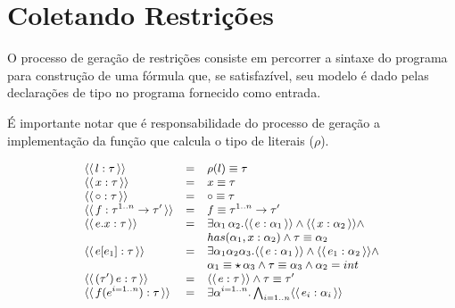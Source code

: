 \documentclass[a4paper,8pt]{article}
\newcommand{\constr}[1]{\ensuremath{\langle\langle\,#1\,\rangle\rangle}}
\begin{document}
      
     \section{Coletando Restrições}\label{constrcollect}

     O processo de geração de restrições consiste em percorrer a
     sintaxe do programa para construção de uma fórmula que, se
     satisfazível, seu modelo é dado pelas declarações de tipo
     no programa fornecido como entrada. 

     É importante notar que é responsabilidade
     do processo de geração a implementação da função que calcula o
     tipo de literais ($\rho$).


     \begin{figure}[h]
       \[\small{
            \begin{array}{lcl}
                \constr{l : \tau} & = & \rho(l) \equiv \tau\\
                \constr{x : \tau} & = & x \equiv \tau \\
                \constr{\circ : \tau} & = & \circ \equiv \tau \\
                \constr{f : \tau^{1..n}\to \tau'} & = & f \equiv
                                                        \tau^{1..n}\to
                                                        \tau' \\
                \constr{e.x : \tau} & = & \exists
                                          \alpha_1\,\alpha_2. \constr{e
                                          : \alpha_1} \land \constr{x
                                          : \alpha_2} \land \\
                          & & has(\alpha_1,x:\alpha_2) \land \tau
                              \equiv \alpha_2\\
                \constr{e[e_1] : \tau} & = & \exists
                                         \alpha_1\alpha_2\alpha_3. \constr{e:\alpha_1}
                                             \land\constr{e_1: \alpha_2}\land\\
                         & & \alpha_1\equiv\star\,\alpha_3 \land \tau
                             \equiv\alpha_3 \land \alpha_2 = int\\
                \constr{(\tau')\,e:\tau} & = & \constr{e : \tau} \land
                                               \tau \equiv \tau'\\
                \constr{f(e^{i=1..n}) : \tau} & = & \exists
                                                    \alpha^{i=1..n}. \bigwedge_{i=1..n}\constr{e_i:\alpha_i}

\end{array}}\]
\end{figure}
\end{document}
